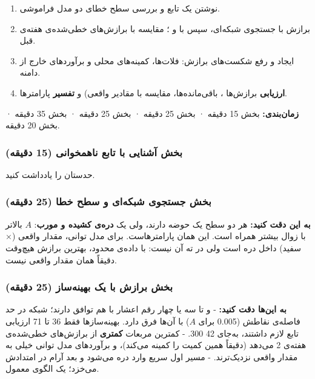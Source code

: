 \begin{enumerate}
\def\labelenumi{\arabic{enumi}.}
\tightlist
\item
  نوشتن یک تابع  و بررسی سطح خطای دو مدل فراموشی.
\item
  برازش با جستجوی شبکه‌ای، سپس با  و ؛
  مقایسه با برازش‌های خطی‌شده‌ی هفته‌ی قبل.
\item
  ایجاد و رفع شکست‌های برازش: فلات‌ها، کمینه‌های محلی و برآوردهای خارج از
  دامنه.
\item
  \textbf{ارزیابی} برازش‌ها ، باقی‌مانده‌ها، مقایسه با مقادیر
  واقعی) و \textbf{تفسیر} پارامترها.
\end{enumerate}

\textbf{زمان‌بندی:} بخش  15 دقیقه · بخش  25 دقیقه · بخش
 25 دقیقه · بخش  35 دقیقه · بخش  20 دقیقه.

\subsubsection{\texorpdfstring{بخش  آشنایی با تابع ناهمخوانی (15
دقیقه)}{بخش A: آشنایی با تابع ناهمخوانی (15 دقیقه)}}

حدستان را یادداشت کنید.

\subsubsection{\texorpdfstring{بخش  جستجوی شبکه‌ای و سطح خطا (25
دقیقه)}{بخش B: جستجوی شبکه‌ای و سطح خطا (25 دقیقه)}}

\textbf{به این دقت کنید:} هر دو سطح یک حوضه دارند، ولی یک \textbf{دره‌ی
کشیده و مورب}: \(A\) بالاتر با زوال بیشتر همراه است. این همان
 پارامترهاست. برای مدل توانی، مقدار واقعی (× سفید) داخل
دره است ولی در ته آن نیست: با داده‌ی محدود، بهترین برازش هیچ‌وقت دقیقاً
همان مقدار واقعی نیست.

\subsubsection{\texorpdfstring{بخش  برازش با یک بهینه‌ساز (25
دقیقه)}{بخش C: برازش با یک بهینه‌ساز (25 دقیقه)}}

\textbf{به این‌ها دقت کنید:} -  و  تا سه یا
چهار رقم اعشار با هم توافق دارند؛ شبکه در حد فاصله‌ی نقاطش (0.005 برای
\(A\)) با آن‌ها فرق دارد. بهینه‌سازها فقط 36 تا 71 ارزیابی تابع لازم
داشتند، به‌جای 42 300. - کمترین مربعات \textbf{ کمتری} از
برازش‌های خطی‌شده‌ی هفته‌ی 2 می‌دهد (دقیقاً همین کمیت را کمینه می‌کند)، و
برآوردهای مدل توانی خیلی به مقدار واقعی نزدیک‌ترند. - مسیر اول سریع وارد
دره می‌شود و بعد آرام در امتدادش می‌خزد؛ یک الگوی معمول.

